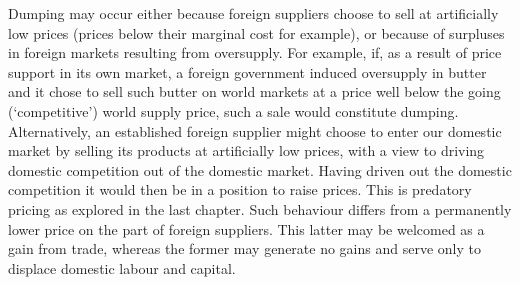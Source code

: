 Dumping may occur either because foreign suppliers choose to sell at
artificially low prices (prices below their marginal cost for example), or
because of surpluses in foreign markets resulting from oversupply. For
example, if, as a result of price support in its own market, a foreign
government induced oversupply in butter and it chose to sell such butter on
world markets at a price well below the going (`competitive') world supply
price, such a sale would constitute dumping. Alternatively, an established
foreign supplier might choose to enter our domestic market by selling its
products at artificially low prices, with a view to driving domestic
competition out of the domestic market. Having driven out the domestic
competition it would then be in a position to raise prices. This is
predatory pricing as explored in the last chapter. Such behaviour differs
from a permanently lower price on the part of foreign suppliers. This latter
may be welcomed as a gain from trade, whereas the former may generate no
gains and serve only to displace domestic labour and capital.